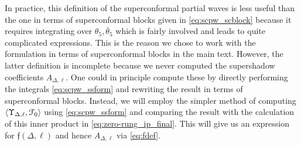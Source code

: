 \documentclass[11pt]{article}
\newcommand{\thetab}{\bar{\theta}}
\begin{document}
In practice, this definition of the superconformal partial waves is less useful than the one in terms of superconformal blocks given in \eqref{eq:scpw_scblock} because it requires integrating over $\theta_{5},\thetab_{5}$ which is fairly involved and leads to quite complicated expressions. This is the reason we chose to work with the formulation in terms of superconformal blocks in the main text. However, the latter definition is incomplete because we never computed the supershadow coefficients $A_{\Delta,\ell}$. One could in principle compute these by directly performing the integrals \eqref{eq:scpw_ssform} and rewriting the result in terms of superconformal blocks. Instead, we will employ the simpler method of computing $\expval{ \Upsilon_{\Delta,\ell}, \mathcal{F}_{0}}$ using \eqref{eq:scpw_ssform} and comparing the result with the calculation of this inner product in \eqref{eq:zero-rung_ip_final}. This will give us an expression for $\mathfrak{f}(\Delta,\ell)$ and hence $A_{\Delta,\ell}$ via \eqref{eq:fdef}.
\end{document}
